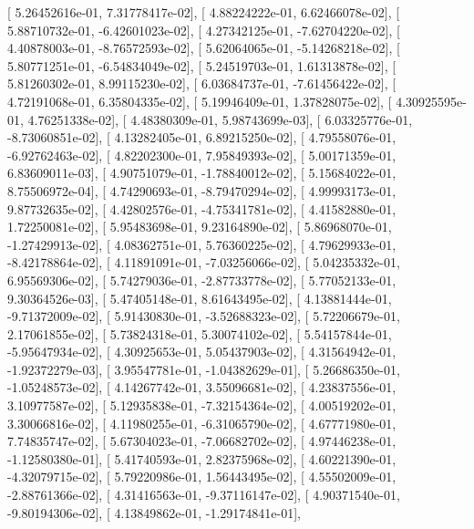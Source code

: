 \documentclass{article}
\begin{document}
       [  5.26452616e-01,   7.31778417e-02],
       [  4.88224222e-01,   6.62466078e-02],
       [  5.88710732e-01,  -6.42601023e-02],
       [  4.27342125e-01,  -7.62704220e-02],
       [  4.40878003e-01,  -8.76572593e-02],
       [  5.62064065e-01,  -5.14268218e-02],
       [  5.80771251e-01,  -6.54834049e-02],
       [  5.24519703e-01,   1.61313878e-02],
       [  5.81260302e-01,   8.99115230e-02],
       [  6.03684737e-01,  -7.61456422e-02],
       [  4.72191068e-01,   6.35804335e-02],
       [  5.19946409e-01,   1.37828075e-02],
       [  4.30925595e-01,   4.76251338e-02],
       [  4.48380309e-01,   5.98743699e-03],
       [  6.03325776e-01,  -8.73060851e-02],
       [  4.13282405e-01,   6.89215250e-02],
       [  4.79558076e-01,  -6.92762463e-02],
       [  4.82202300e-01,   7.95849393e-02],
       [  5.00171359e-01,   6.83609011e-03],
       [  4.90751079e-01,  -1.78840012e-02],
       [  5.15684022e-01,   8.75506972e-04],
       [  4.74290693e-01,  -8.79470294e-02],
       [  4.99993173e-01,   9.87732635e-02],
       [  4.42802576e-01,  -4.75341781e-02],
       [  4.41582880e-01,   1.72250081e-02],
       [  5.95483698e-01,   9.23164890e-02],
       [  5.86968070e-01,  -1.27429913e-02],
       [  4.08362751e-01,   5.76360225e-02],
       [  4.79629933e-01,  -8.42178864e-02],
       [  4.11891091e-01,  -7.03256066e-02],
       [  5.04235332e-01,   6.95569306e-02],
       [  5.74279036e-01,  -2.87733778e-02],
       [  5.77052133e-01,   9.30364526e-03],
       [  5.47405148e-01,   8.61643495e-02],
       [  4.13881444e-01,  -9.71372009e-02],
       [  5.91430830e-01,  -3.52688323e-02],
       [  5.72206679e-01,   2.17061855e-02],
       [  5.73824318e-01,   5.30074102e-02],
       [  5.54157844e-01,  -5.95647934e-02],
       [  4.30925653e-01,   5.05437903e-02],
       [  4.31564942e-01,  -1.92372279e-03],
       [  3.95547781e-01,  -1.04382629e-01],
       [  5.26686350e-01,  -1.05248573e-02],
       [  4.14267742e-01,   3.55096681e-02],
       [  4.23837556e-01,   3.10977587e-02],
       [  5.12935838e-01,  -7.32154364e-02],
       [  4.00519202e-01,   3.30066816e-02],
       [  4.11980255e-01,  -6.31065790e-02],
       [  4.67771980e-01,   7.74835747e-02],
       [  5.67304023e-01,  -7.06682702e-02],
       [  4.97446238e-01,  -1.12580380e-01],
       [  5.41740593e-01,   2.82375968e-02],
       [  4.60221390e-01,  -4.32079715e-02],
       [  5.79220986e-01,   1.56443495e-02],
       [  4.55502009e-01,  -2.88761366e-02],
       [  4.31416563e-01,  -9.37116147e-02],
       [  4.90371540e-01,  -9.80194306e-02],
       [  4.13849862e-01,  -1.29174841e-01],
\end{document}
